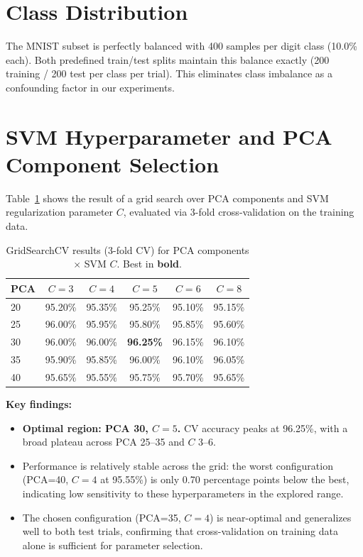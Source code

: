 \documentclass[11pt,a4paper,twocolumn]{article}
\begin{document}
\section{Class Distribution}
\label{app:class-distribution}

The MNIST subset is perfectly balanced with 400 samples per digit class (10.0\% each). Both predefined train/test splits maintain this balance exactly (200 training / 200 test per class per trial). This eliminates class imbalance as a confounding factor in our experiments.

\section{SVM Hyperparameter and PCA Component Selection}
\label{app:gridsearch}

Table~\ref{tab:gridsearch} shows the result of a grid search over PCA components and SVM regularization parameter $C$, evaluated via 3-fold cross-validation on the training data.

\begin{table}[H]
\centering
\caption{GridSearchCV results (3-fold CV) for PCA components $\times$ SVM $C$. Best in \textbf{bold}.}
\label{tab:gridsearch}
\setlength{\tabcolsep}{2pt}
\footnotesize
\begin{tabular}{@{}lccccc@{}}
\toprule
\textbf{PCA} & $C=3$ & $C=4$ & $C=5$ & $C=6$ & $C=8$ \\
\midrule
20 & 95.20\% & 95.35\% & 95.25\% & 95.10\% & 95.15\% \\
25 & 96.00\% & 95.95\% & 95.80\% & 95.85\% & 95.60\% \\
30 & 96.00\% & 96.00\% & \textbf{96.25\%} & 96.15\% & 96.10\% \\
35 & 95.90\% & 95.85\% & 96.00\% & 96.10\% & 96.05\% \\
40 & 95.65\% & 95.55\% & 95.75\% & 95.70\% & 95.65\% \\
\bottomrule
\end{tabular}
\end{table}

\textbf{Key findings:}
\begin{itemize}[noitemsep]
    \item \textbf{Optimal region: PCA 30, $C=5$.} CV accuracy peaks at 96.25\%, with a broad plateau across PCA 25--35 and $C$ 3--6.
    \item Performance is relatively stable across the grid: the worst configuration (PCA=40, $C=4$ at 95.55\%) is only 0.70 percentage points below the best, indicating low sensitivity to these hyperparameters in the explored range.
    \item The chosen configuration (PCA=35, $C=4$) is near-optimal and generalizes well to both test trials, confirming that cross-validation on training data alone is sufficient for parameter selection.
\end{itemize}
\end{document}
